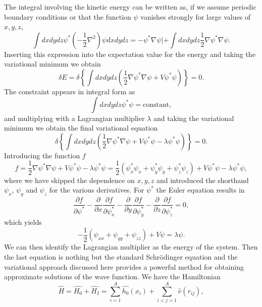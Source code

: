 The integral involving the kinetic energy can be written as, if we
assume periodic boundary conditions or that the function $\psi$
vanishes strongly for large values of $x,y,z$,
 \[
  \int dxdydz \psi^* \left(-\frac{1}{2}\nabla^2\right) \psi dxdydz =
  -\psi^*\nabla\psi|+\int dxdydz\frac{1}{2}\nabla\psi^*\nabla\psi.
\]
Inserting this expression into the expectation value for the energy
and taking the variational minimum we obtain
\[
\delta E = \delta \left\{\int dxdydz\left(
\frac{1}{2}\nabla\psi^*\nabla\psi+V\psi^*\psi\right)\right\} = 0.
\]
The constraint appears in integral form as
\[
 \int dxdydz \psi^* \psi=\mathrm{constant},
\]
and multiplying with a Lagrangian multiplier $\lambda$ and taking the
variational minimum we obtain the final variational equation
\[
\delta \left\{\int dxdydz\left(
\frac{1}{2}\nabla\psi^*\nabla\psi+V\psi^*\psi-\lambda\psi^*\psi\right)\right\}
= 0.
\]
Introducing the function $f$
\[
  f = \frac{1}{2}\nabla\psi^*\nabla\psi+V\psi^*\psi-\lambda\psi^*\psi=
  \frac{1}{2}(\psi^*_x\psi_x+\psi^*_y\psi_y+\psi^*_z\psi_z)+V\psi^*\psi-\lambda\psi^*\psi,
\]
where we have skipped the dependence on $x,y,z$ and introduced the
shorthand $\psi_x$, $\psi_y$ and $\psi_z$ for the various derivatives.
For $\psi^*$ the Euler equation results in
\[
\frac{\partial f}{\partial \psi^*}- \frac{\partial }{\partial
  x}\frac{\partial f}{\partial \psi^*_x}-\frac{\partial }{\partial
  y}\frac{\partial f}{\partial \psi^*_y}-\frac{\partial }{\partial
  z}\frac{\partial f}{\partial \psi^*_z}=0,
\] 
which yields
\[
    -\frac{1}{2}(\psi_{xx}+\psi_{yy}+\psi_{zz})+V\psi=\lambda \psi.
\]
We can then identify the Lagrangian multiplier as the energy of the
system. Then the last equation is nothing but the standard
Schr\"odinger equation and the variational approach discussed here
provides a powerful method for obtaining approximate solutions of the
wave function.  We have the Hamiltonian
\[
    \hat{H} = \hat{H_0} + \hat{H_I} = \sum_{i=1}^A\hat{h_0}(x_i) +
    \sum_{i<j=1}^A\hat{v}(r_{ij}),
\]

